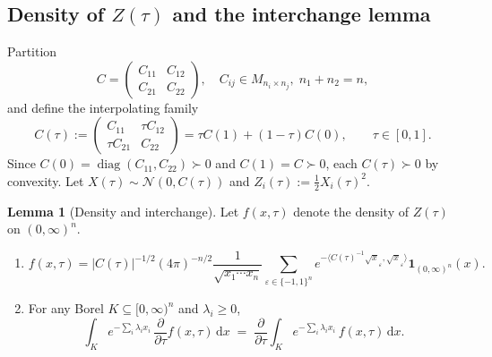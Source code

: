 \documentclass[12pt,a4paper]{article}
\theoremstyle{definition}
\newtheorem{lemma}[theorem]{Lemma}
\newcommand{\diag}{\operatorname{diag}}
\newcommand{\dd}{\mathrm{d}}
\newcommand{\ind}{\mathbf{1}}
\newcommand{\caln}{\mathcal{N}}
\begin{document}
\subsection{Density of \texorpdfstring{$Z(\tau)$}{Z(tau)} and the interchange lemma}

Partition
\begin{equation}\label{eq:partition}
  C=\begin{pmatrix}C_{11}&C_{12}\\C_{21}&C_{22}\end{pmatrix},
  \quad C_{ij}\in M_{n_i\times n_j},\;n_1+n_2=n,
\end{equation}
and define the interpolating family
\begin{equation}\label{eq:Ctau}
  C(\tau):=\begin{pmatrix}C_{11}&\tau C_{12}\\
    \tau C_{21}&C_{22}\end{pmatrix}
  =\tau C(1)+(1-\tau)C(0),\qquad\tau\in[0,1].
\end{equation}
Since $C(0)=\diag(C_{11},C_{22})\succ 0$ and $C(1)=C\succ 0$, each
$C(\tau)\succ 0$ by convexity.  Let $X(\tau)\sim\caln(0,C(\tau))$ and
$Z_i(\tau):=\tfrac{1}{2}X_i(\tau)^2$.

\begin{lemma}[Density and interchange]\label{lem:diff}
  Let $f(x,\tau)$ denote the density of $Z(\tau)$ on $(0,\infty)^n$.
  \begin{enumerate}[label=(\roman*),nosep]
    \item
    \begin{equation}\label{eq:fxtau}
      f(x,\tau)
      =|C(\tau)|^{-1/2}(4\pi)^{-n/2}
      \frac{1}{\sqrt{x_1\cdots x_n}}
      \sum_{\varepsilon\in\{-1,1\}^n}
      e^{-\langle C(\tau)^{-1}\sqrt{x}_\varepsilon,
        \sqrt{x}_\varepsilon\rangle}
      \ind_{(0,\infty)^n}(x).
    \end{equation}
    \item For any Borel $K\subseteq[0,\infty)^n$ and
    $\lambda_i\geqslant 0$,
    \begin{equation}\label{eq:interchange}
      \int_K e^{-\sum_i\lambda_ix_i}\,
      \frac{\partial}{\partial\tau}f(x,\tau)\,\dd x
      \;=\;
      \frac{\partial}{\partial\tau}\int_K e^{-\sum_i\lambda_ix_i}\,
      f(x,\tau)\,\dd x.
    \end{equation}
  \end{enumerate}
\end{lemma}
\end{document}
